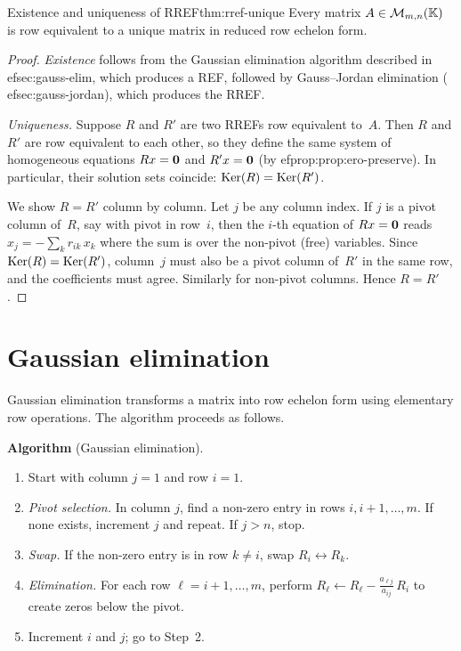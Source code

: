 \begin{theorem}{Existence and uniqueness of RREF}{thm:rref-unique}
Every matrix $A\in\mathcal{M}_{m,n}({\mathbb{K}})$ is row equivalent to a unique
matrix in reduced row echelon form.
\end{theorem}

\begin{proof}
\emph{Existence} follows from the Gaussian elimination algorithm
described in 
ef{sec:gauss-elim}, which produces a REF, followed
by Gauss--Jordan elimination (
ef{sec:gauss-jordan}), which
produces the RREF.

\emph{Uniqueness.}
Suppose $R$ and $R'$ are two RREFs row equivalent to~$A$. Then
$R$ and $R'$ are row equivalent to each other, so they define the
same system of homogeneous equations $Rx=\mathbf{0}$ and $R'x=\mathbf{0}$
(by 
ef{prop:prop:ero-preserve}). In particular, their solution sets
coincide: $\operatorname{Ker}(R) = \operatorname{Ker}(R')$.

We show $R = R'$ column by column. Let $j$ be any column index.
If $j$ is a pivot column of~$R$, say with pivot in row~$i$, then
the $i$-th equation of $Rx = \mathbf{0}$ reads $x_j = -\sum_{k}
r_{ik}\,x_k$ where the sum is over the non-pivot (free) variables.
Since $\operatorname{Ker}(R) = \operatorname{Ker}(R')$, column~$j$ must also be a pivot column
of~$R'$ in the same row, and the coefficients must agree. Similarly
for non-pivot columns. Hence $R = R'$.
\end{proof}


\section{Gaussian elimination}\label{sec:gauss-elim}

Gaussian elimination transforms a matrix into row echelon form using
elementary row operations. The algorithm proceeds as follows.

\medskip
\noindent\textbf{Algorithm} (Gaussian elimination).
\begin{enumerate}[label=\textbf{Step \arabic*.}]
  \item Start with column $j=1$ and row $i=1$.
  \item \emph{Pivot selection.} In column $j$, find a non-zero entry
    in rows $i, i+1, \dots, m$. If none exists, increment $j$ and
    repeat. If $j > n$, stop.
  \item \emph{Swap.} If the non-zero entry is in row $k\neq i$,
    swap $R_i \leftrightarrow R_k$.
  \item \emph{Elimination.} For each row $\ell = i+1, \dots, m$,
    perform $R_\ell \leftarrow R_\ell -
    \frac{a_{\ell j}}{a_{ij}}\,R_i$ to create zeros below the pivot.
  \item Increment $i$ and $j$; go to Step~2.
\end{enumerate}

